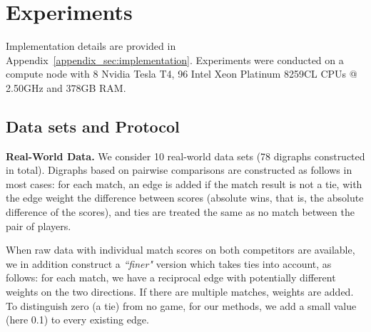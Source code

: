 \documentclass[nohyperref]{article}
\theoremstyle{plain}
\theoremstyle{definition}
\theoremstyle{remark}
\begin{document}
\section{Experiments}
Implementation details are provided in Appendix~\ref{appendix_sec:implementation}. 
Experiments were conducted on a compute node with 8 Nvidia Tesla T4, 96 Intel Xeon Platinum 8259CL CPUs @ 2.50GHz and $378$GB RAM.
\subsection{Data sets and Protocol}
\textbf{Real-World Data.} 
We consider 10 real-world data sets (78 digraphs constructed in total). Digraphs based on pairwise comparisons are constructed as follows in most cases: for each match, an edge is added if the match result is not a tie, 
with the edge  weight  
the difference between scores (absolute wins, that is, the absolute difference of the scores), 
and ties are treated the same as no match between the pair of players. 

When raw data with individual match scores on both competitors are available, we in addition construct a \emph{``finer"} version which takes ties into account, as follows: for each match, we have a reciprocal edge with potentially different weights on the two
directions. If there are multiple matches, weights are added. To distinguish zero (a tie) from
no game, for our methods, we add
a small value (here 0.1) to every existing edge. 
\end{document}
